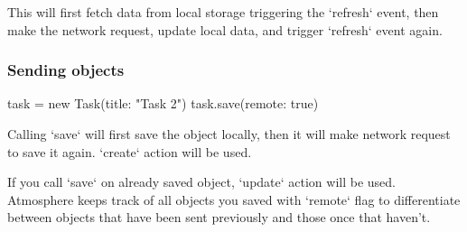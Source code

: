 This will first fetch data from local storage triggering the `refresh` event, then make the network request, update local data, and trigger `refresh` event again.

\subsubsection{Sending objects}

    task = new Task({title: "Task 2"})
    task.save(remote: true)

Calling `save` will first save the object locally, then it will make network request to save it again. `create` action will be used.

If you call `save` on already saved object, `update` action will be used. Atmosphere keeps track of all objects you saved with `remote` flag to differentiate between objects that have been sent previously and those once that haven't.
